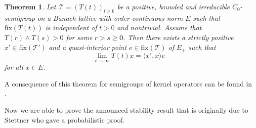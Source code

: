 \documentclass{amsart}
\numberwithin{equation}{section}
\newtheorem{thm}{Theorem}[section]
\theoremstyle{remark}
\theoremstyle{definition}
\begin{document}
\begin{thm}
\label{thm:greiner}
	Let $\mathscr{T} = (T(t))_{t \geq 0}$ be a positive, bounded and irreducible $C_0$-semigroup on 
	a Banach lattice with order continuous norm $E$ such that
	${\mathrm{fix}}(T(t))$ is independent of $t>0$ and nontrivial.
	Assume that $T(r)\wedge T(s) >0$ for some $r>s\geq 0$.
	Then there exists a strictly positive $x' \in {\mathrm{fix}}(\mathscr{T'})$ and a quasi-interior point $e \in {\mathrm{fix}}(\mathscr{T})$ of $E_+$
	such that
	\[ \lim_{t\to\infty} T(t)x = {\langle {x'},{x}\rangle} e\]
	for all $x\in E$.
\end{thm}

A consequence of this theorem for semigroups of kernel operators can be found in \cite{arendt2008}.

Now we are able to prove the announced stability result that is originally due to Stettner \cite[Thm 1]{stettner1994}
who gave a probabilistic proof.
\end{document}
